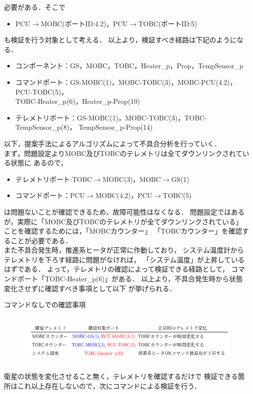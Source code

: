 \documentclass[11pt]{article}
\begin{document}
必要がある．そこで
\begin{itemize}
   \item PCU$\rightarrow$MOBC(ポートID:4.2)，PCU$\rightarrow$TOBC(ポートID:5)
\end{itemize}
も検証を行う対象として考える．
以上より，検証すべき経路は下記のようになる．
\begin{itemize}
   \item コンポーネント：GS，MOBC，TOBC，Heater\_p，Prop，TempSensor\_p
   \item コマンドポート：GS-MOBC(1)，MOBC-TOBC(3)，MOBC-PCU(4.2)，
   PCU-TOBC(5)，\\TOBC-Heater\_p(6)，Heater\_p-Prop(10)
   \item テレメトリポート：GS-MOBC(1)，MOBC-TOBC(3)，TOBC-TempSensor\_p(8)，
   TempSensor\_p-Prop(14)
\end{itemize}
以下，提案手法によるアルゴリズムによって不具合分析を行っていく．\\
まず，問題設定よりMOBC及びTOBCのテレメトリは全てダウンリンクされている状態に
あるので，
\begin{itemize}
   \item テレメトリポート:TOBC$\rightarrow$MOBC(3)，MOBC$\rightarrow$GS(1)
   \item コマンドポート：PCU$\rightarrow$MOBC(4.2)，PCU$\rightarrow$TOBC(5)
\end{itemize}
は問題ないことが確認できるため，故障可能性はなくなる．
問題設定ではあるが，実際に「MOBC及びTOBCのテレメトリが全てダウンリンクされている」
ことを確認するためには，「MOBCカウンター」
「TOBCカウンター」を確認することが必要である．\\
また不具合発生時，推進系ヒータが正常に作動しており，
システム温度計からテレメトリを下ろす経路に問題がなければ，
「システム温度」が上昇しているはずである．
よって，テレメトリの確認によって検証できる経路として，
コマンドポート「TOBC-Heater\_p(6)」がある．
以上より，不具合発生時から状態変化させずに確認すべき事項として以下
が挙げられる．

\begin{table}[H]
   \centering
   \caption{コマンドなしでの確認事項} 
   \label{tab:check_list1}
\end{table}
\vspace{-2zh}
\begin{figure}[H]
   \centering
      \includegraphics[height=2.5cm]{figure/check_list_tel.png}
\end{figure}
衛星の状態を変化させること無く，テレメトリを確認するだけで
検証できる箇所はこれ以上存在しないので，次にコマンドによる検証を行う．
\end{document}
